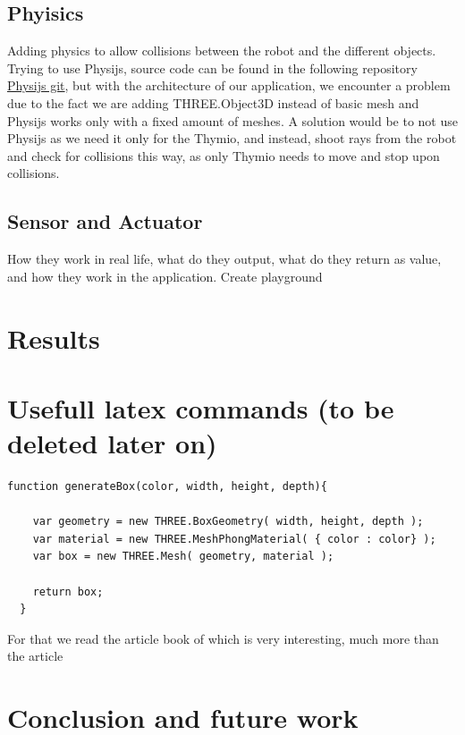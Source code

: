 \documentclass{scrartcl}
\begin{document}
\subsection{Phyisics}

Adding physics to allow collisions between the robot and the different objects. Trying to use Physijs, source code can be found in the following repository \href{https://github.com/chandlerprall/Physijs/wiki/Basic-Setup}{Physijs git}, 
but with the architecture of our application, we encounter a problem due to the fact we are adding THREE.Object3D instead of basic mesh and Physijs works only with a fixed amount of meshes. A solution would be to not use Physijs as we need it only for the Thymio,
and instead, shoot rays from the robot and check for collisions this way, as only Thymio needs to move and stop upon collisions.

\subsection{Sensor and Actuator}
How they work in real life, what do they output, what do they return as value, and how they work in the application.
Create playground

\section{Results}



\section{Usefull latex commands (to be deleted later on)}
\lstset{language=JavaScript}
\begin{lstlisting}[basicstyle=\ttfamily\small]
  function generateBox(color, width, height, depth){

    var geometry = new THREE.BoxGeometry( width, height, depth );
    var material = new THREE.MeshPhongMaterial( { color : color} );
    var box = new THREE.Mesh( geometry, material );
                
    return box;
  }
\end{lstlisting}
For that we read the article book of \cite{Jerald:2015:VBH:2792790}
which is very interesting, much more than the article
\cite{Diniz:2017:UGO:3100317.3100324}

\section{Conclusion and future work}
\end{document}
